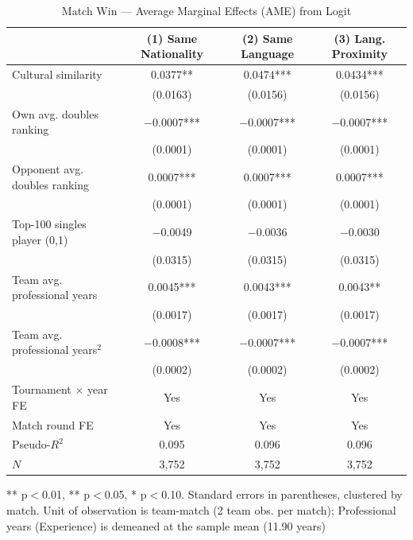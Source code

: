 \documentclass[10pt]{article}
\begin{document}
\begin{table}[htbp]
\color{blue}
\centering
\caption{Match Win — Average Marginal Effects (AME) from Logit \label{tab:t3}}
\begin{threeparttable}
\begin{tabular}{lccc}
\toprule
 & (1) Same Nationality & (2) Same Language & (3) Lang. Proximity \\
\midrule
Cultural similarity & 0.0377** & 0.0474*** & 0.0434*** \\
 & (0.0163) & (0.0156) & (0.0156) \\
Own avg. doubles ranking & $-$0.0007*** & $-$0.0007*** & $-$0.0007*** \\
 & (0.0001) & (0.0001) & (0.0001) \\
Opponent avg. doubles ranking & 0.0007*** & 0.0007*** & 0.0007*** \\
 & (0.0001) & (0.0001) & (0.0001) \\
Top-100 singles player (0,1)& $-$0.0049 & $-$0.0036 & $-$0.0030 \\
 & (0.0315) & (0.0315) & (0.0315) \\
Team avg. professional years  & 0.0045*** & 0.0043*** & 0.0043** \\
 & (0.0017) & (0.0017) & (0.0017) \\
Team avg. professional years$^2$  & $-$0.0008*** & $-$0.0007*** & $-$0.0007*** \\
 & (0.0002) & (0.0002) & (0.0002) \\
\midrule
Tournament $\times$ year FE & Yes & Yes & Yes \\
Match round FE & Yes & Yes & Yes \\
Pseudo-$R^2$ & 0.095 & 0.096 & 0.096 \\
$N$ & 3,752 & 3,752 & 3,752 \\
\bottomrule
\end{tabular}
\begin{tablenotes}
\small
\item *** p$<$0.01, ** p$<$0.05, * p$<$0.10. Standard errors in parentheses, clustered by match. Unit of observation is team-match (2 team obs. per match); Professional years (Experience) is demeaned at the sample mean (11.90 years)
\end{tablenotes}
\end{threeparttable}
\end{table}
\FloatBarrier
\end{document}
